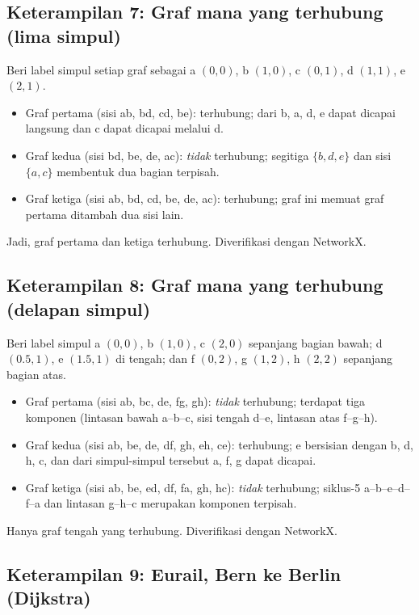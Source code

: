 \subsection*{Keterampilan 7: Graf mana yang terhubung (lima simpul)}

Beri label simpul setiap graf sebagai a $(0,0)$, b $(1,0)$, c $(0,1)$, d $(1,1)$, e $(2,1)$.
\begin{itemize}
\item Graf pertama (sisi ab, bd, cd, be): terhubung; dari b, a, d, e dapat dicapai langsung dan c dapat dicapai melalui d.
\item Graf kedua (sisi bd, be, de, ac): \emph{tidak} terhubung; segitiga $\{b,d,e\}$ dan sisi $\{a,c\}$ membentuk dua bagian terpisah.
\item Graf ketiga (sisi ab, bd, cd, be, de, ac): terhubung; graf ini memuat graf pertama ditambah dua sisi lain.
\end{itemize}
Jadi, graf pertama dan ketiga terhubung. Diverifikasi dengan NetworkX.

\subsection*{Keterampilan 8: Graf mana yang terhubung (delapan simpul)}

Beri label simpul a $(0,0)$, b $(1,0)$, c $(2,0)$ sepanjang bagian bawah; d $(0.5,1)$, e $(1.5,1)$ di tengah; dan f $(0,2)$, g $(1,2)$, h $(2,2)$ sepanjang bagian atas.
\begin{itemize}
\item Graf pertama (sisi ab, bc, de, fg, gh): \emph{tidak} terhubung; terdapat tiga komponen (lintasan bawah a--b--c, sisi tengah d--e, lintasan atas f--g--h).
\item Graf kedua (sisi ab, be, de, df, gh, eh, ce): terhubung; e bersisian dengan b, d, h, c, dan dari simpul-simpul tersebut a, f, g dapat dicapai.
\item Graf ketiga (sisi ab, be, ed, df, fa, gh, hc): \emph{tidak} terhubung; siklus-5 a--b--e--d--f--a dan lintasan g--h--c merupakan komponen terpisah.
\end{itemize}
Hanya graf tengah yang terhubung. Diverifikasi dengan NetworkX.

\subsection*{Keterampilan 9: Eurail, Bern ke Berlin (Dijkstra)}

